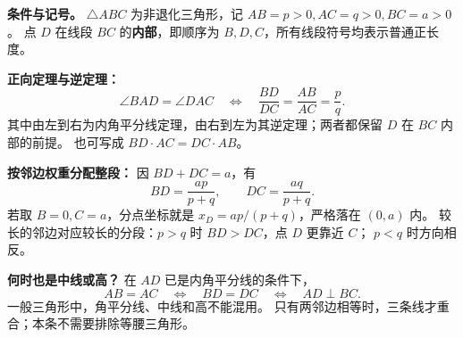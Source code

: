 \begin{statementbox}
\textbf{条件与记号。} $\triangle ABC$ 为非退化三角形，记 $AB=p>0,AC=q>0,BC=a>0$。
点 $D$ 在线段 $BC$ 的\textbf{内部}，即顺序为 $B,D,C$，所有线段符号均表示普通正长度。

\textbf{正向定理与逆定理：}
\[
 \boxed{\angle BAD=\angle DAC
 \quad\Longleftrightarrow\quad
 \frac{BD}{DC}=\frac{AB}{AC}=\frac pq}.
\]
其中由左到右为内角平分线定理，由右到左为其逆定理；两者都保留 $D$ 在 $BC$ 内部的前提。
也可写成 $BD\cdot AC=DC\cdot AB$。

\textbf{按邻边权重分配整段：} 因 $BD+DC=a$，有
\[
 \boxed{BD=\frac{ap}{p+q},\qquad DC=\frac{aq}{p+q}}.
\]
若取 $B=0,C=a$，分点坐标就是 $x_D=ap/(p+q)$，严格落在 $(0,a)$ 内。
较长的邻边对应较长的分段：$p>q$ 时 $BD>DC$，点 $D$ 更靠近 $C$；
$p<q$ 时方向相反。

\textbf{何时也是中线或高？} 在 $AD$ 已是内角平分线的条件下，
\[
 AB=AC\quad\Longleftrightarrow\quad BD=DC
 \quad\Longleftrightarrow\quad AD\perp BC.
\]
一般三角形中，角平分线、中线和高不能混用。
只有两邻边相等时，三条线才重合；本条不需要排除等腰三角形。
\end{statementbox}
